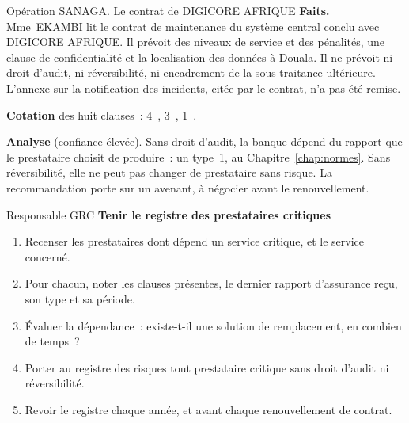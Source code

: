 \begin{boxscenario}{Opération SANAGA. Le contrat de DIGICORE AFRIQUE}
\textbf{Faits.} Mme~EKAMBI lit le contrat de maintenance du système central
conclu avec DIGICORE AFRIQUE. Il prévoit des niveaux de service et des
pénalités, une clause de confidentialité et la localisation des données à
Douala. Il ne prévoit ni droit d'audit, ni réversibilité, ni encadrement de
la sous-traitance ultérieure. L'annexe sur la notification des incidents,
citée par le contrat, n'a pas été remise.

\medskip
\textbf{Cotation} des huit clauses~: 4~\OUI{}, 3~\NON{}, 1~\NEK{}.

\medskip
\textbf{Analyse} (confiance élevée). Sans droit d'audit, la banque dépend du
rapport que le prestataire choisit de produire~: un type~1, au
Chapitre~\ref{chap:normes}. Sans réversibilité, elle ne peut pas changer de
prestataire sans risque. La recommandation porte sur un avenant, à
négocier avant le renouvellement.
\end{boxscenario}

\begin{boxmetier}{Responsable GRC}
\textbf{Tenir le registre des prestataires critiques}
\begin{enumerate}
    \item Recenser les prestataires dont dépend un service critique, et
          le service concerné.
    \item Pour chacun, noter les clauses présentes, le dernier rapport
          d'assurance reçu, son type et sa période.
    \item Évaluer la dépendance~: existe-t-il une solution de remplacement,
          en combien de temps~?
    \item Porter au registre des risques tout prestataire critique sans
          droit d'audit ni réversibilité.
    \item Revoir le registre chaque année, et avant chaque renouvellement
          de contrat.
\end{enumerate}
\end{boxmetier}


\separateur

